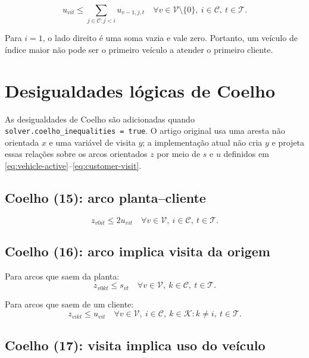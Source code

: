 \documentclass[11pt,a4paper]{article}
\newcommand{\set}[1]{\mathcal{#1}}
\begin{document}
\begin{equation}
  u_{vit}\le \sum_{j\in\set{C}:j<i}u_{v-1,j,t}
  \quad \forall v\in\set{V}\setminus\{0\},\ i\in\set{C},\ t\in\set{T}.
  \label{eq:HC1}
\end{equation}

Para $i=1$, o lado direito é uma soma vazia e vale zero. Portanto, um veículo
de índice maior não pode ser o primeiro veículo a atender o primeiro cliente.

\section{Desigualdades lógicas de Coelho}

As desigualdades de Coelho são adicionadas quando
\texttt{solver.coelho\_inequalities = true}. O artigo original usa uma aresta
não orientada $x$ e uma variável de visita $y$; a implementação atual não cria
$y$ e projeta essas relações sobre os arcos orientados $z$ por meio de $s$ e
$u$ definidos em \eqref{eq:vehicle-active}--\eqref{eq:customer-visit}.

\subsection{Coelho (15): arco planta--cliente}

\begin{equation}
  z_{v0it}\le 2u_{vit}
  \quad \forall v\in\set{V},\ i\in\set{C},\ t\in\set{T}.
  \label{eq:coelho-15}
\end{equation}

\subsection{Coelho (16): arco implica visita da origem}

Para arcos que saem da planta:
\begin{equation}
  z_{v0kt}\le s_{vt}
  \quad \forall v\in\set{V},\ k\in\set{C},\ t\in\set{T}.
  \label{eq:coelho-16-plant}
\end{equation}

Para arcos que saem de um cliente:
\begin{equation}
  z_{vikt}\le u_{vit}
  \quad \forall v\in\set{V},\ i\in\set{C},\ k\in\set{K}:k\ne i,\ t\in\set{T}.
  \label{eq:coelho-16-customer}
\end{equation}

\subsection{Coelho (17): visita implica uso do veículo}
\end{document}
